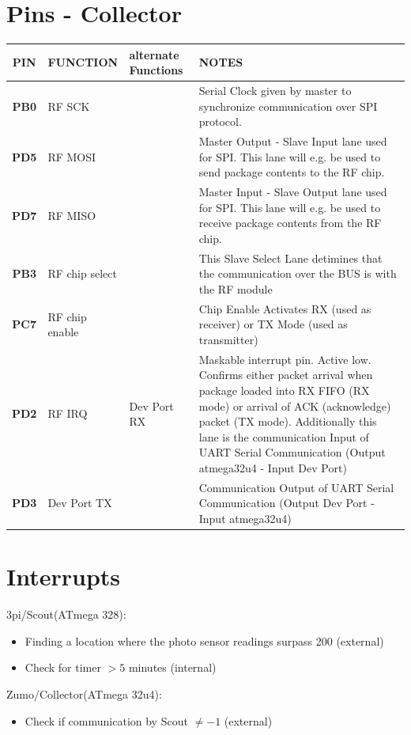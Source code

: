 \documentclass[12pt]{article}
\begin{document}
\vspace{1cm}

\newpage
\section*{Pins - Collector}
\small
\begin{tabular}{| c || p{30mm} | p{30mm} | p{60mm} |}
  \hline
  \textbf{PIN} & FUNCTION & alternate Functions & NOTES\\
  \hline
  \hline
  \textbf{PB0} & RF SCK &  & Serial Clock given by master to synchronize communication over SPI protocol. \\
  \hline
  \textbf{PD5} & RF MOSI &  & Master Output - Slave Input lane used for SPI. This lane will e.g. be used to send package contents to the RF chip.\\
  \hline
  \textbf{PD7} & RF MISO &  & Master Input - Slave Output lane used for SPI. This lane will e.g. be used to receive package contents from the RF chip.\\
  \hline
  \textbf{PB3} & RF chip select &  & This Slave Select Lane detimines that the communication over the BUS is with the RF module\\
  \hline
  \textbf{PC7} & RF chip enable &  & Chip Enable Activates RX (used as receiver) or TX Mode (used as transmitter) \\
  \hline
  \textbf{PD2} & RF IRQ & Dev Port RX & Maskable interrupt pin. Active low. Confirms either packet arrival when package loaded into RX FIFO (RX mode) or arrival of ACK (acknowledge) packet (TX mode). Additionally this lane is the communication Input of UART Serial Communication (Output atmega32u4 - Input Dev Port) \\
  \hline
  \textbf{PD3} & Dev Port TX &  & Communication Output of UART Serial Communication (Output Dev Port - Input atmega32u4) \\
  \hline
\end{tabular}
\normalsize

\newpage
\section*{Interrupts}
3pi/Scout(ATmega 328): \\
\begin{itemize}
\item Finding a location where the photo sensor readings surpass 200 (external)
\item Check for timer $> 5$ minutes (internal)
\end{itemize}
Zumo/Collector(ATmega 32u4): \\
\begin{itemize}
\item Check if communication by Scout $\neq -1$ (external)
\end{itemize} 
\end{document}
